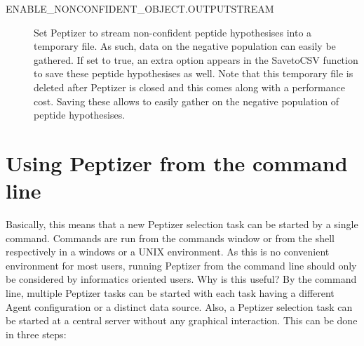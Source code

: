 \begin{description}
\item[ENABLE\_NONCONFIDENT\_OBJECT.OUTPUTSTREAM]  Set Peptizer to stream non-confident peptide hypothesises into a temporary file. As such, data on the negative population can easily be gathered. If set to true, an extra option appears in the SavetoCSV function to save these peptide hypothesises as well. Note that this temporary file is deleted after Peptizer is closed and this comes along with a performance cost. \npar Saving these allows to easily gather on the negative population of peptide hypothesises.
\end{description}
%
\section{Using Peptizer from the command line}
\npar Basically, this means that a new Peptizer selection task can be started by a single command. Commands are run from the commands window or from the shell respectively in a windows or a UNIX environment. As this is no convenient environment for most users, running Peptizer from the command line should only be considered by informatics oriented users.
\npar Why is this useful? By the command line, multiple Peptizer tasks can be started with each task having a different Agent configuration or a distinct data source. Also, a Peptizer selection task can be started at a central server without any graphical interaction.
\npar This can be done in three steps:
\renewcommand{\labelenumi}{\textbf{\arabic{enumi}}.}
